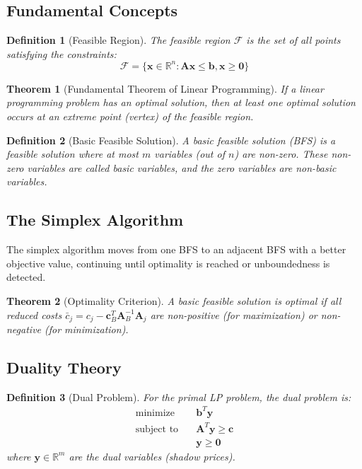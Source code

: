 \documentclass[a4paper, 11pt]{article}
\newtheorem{definition}{Definition}[section]
\newtheorem{theorem}{Theorem}[section]
\begin{document}
\subsection{Fundamental Concepts}

\begin{definition}[Feasible Region]
The feasible region $\mathcal{F}$ is the set of all points satisfying the constraints:
\begin{equation}
\mathcal{F} = \{\mathbf{x} \in \mathbb{R}^n : \mathbf{A}\mathbf{x} \leq \mathbf{b}, \mathbf{x} \geq \mathbf{0}\}
\end{equation}
\end{definition}

\begin{theorem}[Fundamental Theorem of Linear Programming]
If a linear programming problem has an optimal solution, then at least one optimal solution
occurs at an extreme point (vertex) of the feasible region.
\end{theorem}

\begin{definition}[Basic Feasible Solution]
A basic feasible solution (BFS) is a feasible solution where at most $m$ variables (out of $n$)
are non-zero. These non-zero variables are called \textit{basic variables}, and the zero
variables are \textit{non-basic variables}.
\end{definition}

\subsection{The Simplex Algorithm}

The simplex algorithm moves from one BFS to an adjacent BFS with a better objective value,
continuing until optimality is reached or unboundedness is detected.

\begin{theorem}[Optimality Criterion]
A basic feasible solution is optimal if all reduced costs $\bar{c}_j = c_j - \mathbf{c}_B^T \mathbf{A}_B^{-1} \mathbf{A}_j$
are non-positive (for maximization) or non-negative (for minimization).
\end{theorem}

\subsection{Duality Theory}

\begin{definition}[Dual Problem]
For the primal LP problem, the dual problem is:
\begin{equation}
\begin{aligned}
\text{minimize} \quad & \mathbf{b}^T \mathbf{y} \\
\text{subject to} \quad & \mathbf{A}^T\mathbf{y} \geq \mathbf{c} \\
& \mathbf{y} \geq \mathbf{0}
\end{aligned}
\end{equation}
where $\mathbf{y} \in \mathbb{R}^m$ are the dual variables (shadow prices).
\end{definition}
\end{document}
